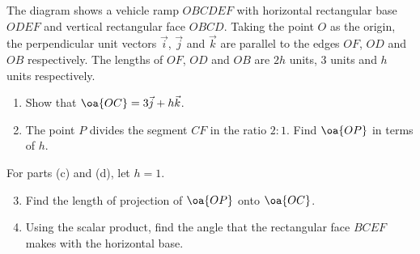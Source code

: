 \begin{problem}
    \begin{center}
    \end{center}

    The diagram shows a vehicle ramp $OBCDEF$ with horizontal rectangular base $ODEF$ and vertical rectangular face $OBCD$. Taking the point $O$ as the origin, the perpendicular unit vectors $\vec i$, $\vec j$ and $\vec k$ are parallel to the edges $OF$, $OD$ and $OB$ respectively. The lengths of $OF$, $OD$ and $OB$ are $2h$ units, 3 units and $h$ units respectively.

    \begin{enumerate}
        \item Show that $\oa{OC} = 3 \vec j + h \vec k$.
        \item The point $P$ divides the segment $CF$ in the ratio $2:1$. Find $\oa{OP}$ in terms of $h$.
    \end{enumerate}

    For parts (c) and (d), let $h = 1$.

    \begin{enumerate}
        \setcounter{enumi}{2}
        \item Find the length of projection of $\oa{OP}$ onto $\oa{OC}$.
        \item Using the scalar product, find the angle that the rectangular face $BCEF$ makes with the horizontal base.
    \end{enumerate}
\end{problem}
